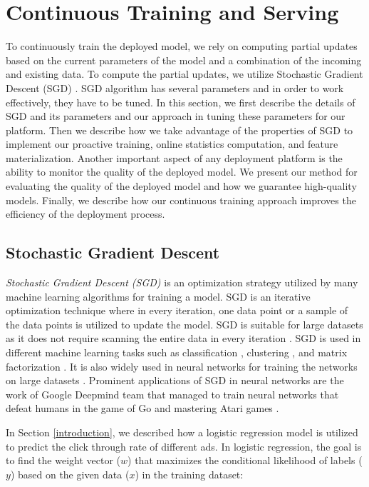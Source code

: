 \section{Continuous Training and Serving} \label{continuous-training-serving}
To continuously train the deployed model, we rely on computing partial updates based on the current parameters of the model and a combination of the incoming and existing data.
To compute the partial updates, we utilize Stochastic Gradient Descent (SGD) \cite{zhang2004solving}.
SGD algorithm has several parameters and in order to work effectively, they have to be tuned.
In this section, we first describe the details of SGD and its parameters and our approach in tuning these parameters for our platform.
Then we describe how we take advantage of the properties of SGD to implement our proactive training, online statistics computation, and feature materialization.
Another important aspect of any deployment platform is the ability to monitor the quality of the deployed model.
We present our method for evaluating the quality of the deployed model and how we guarantee high-quality models.
Finally, we describe how our continuous training approach improves the efficiency of the deployment process.

\subsection{Stochastic Gradient Descent} \label{sgd}
\textit{Stochastic Gradient Descent (SGD)} is an optimization strategy utilized by many machine learning algorithms for training a model.
SGD is an iterative optimization technique where in every iteration, one data point or a sample of the data points is utilized to update the model.
SGD is suitable for large datasets as it does not require scanning the entire data in every iteration \cite{bottou2010large}.
SGD is used in different machine learning tasks such as classification \cite{zhang2004solving, macmahan2013}, clustering \cite{bottou1995convergence}, and matrix factorization \cite{koren2009matrix,  funk2006netflix}.
It is also widely used in neural networks for training the networks on large datasets \cite{dean2012large}.
Prominent applications of SGD in neural networks are the work of Google Deepmind team that managed to train neural networks that defeat humans in the game of Go \cite{silver2016mastering} and mastering Atari games \cite{mnih2013playing}.

In Section \ref{introduction}, we described how a logistic regression model is utilized to predict the click through rate of different ads.
In logistic regression, the goal is to find the weight vector ($w$) that maximizes the conditional likelihood of labels ($y$) based on the given data ($x$) in the training dataset:

